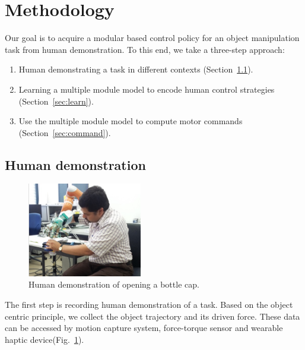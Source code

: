\documentclass[preprint,12pt]{elsarticle}
\begin{document}
\section{Methodology}
\label{sec:method}
Our goal is to acquire a modular based control policy for an object manipulation task from human demonstration. To this end, we take a three-step approach:
\begin{enumerate}
\item Human demonstrating a task in different contexts (Section~\ref{sec:demo}).
\item Learning a multiple module model to encode human control strategies (Section~\ref{sec:learn}).
\item Use the multiple module model to compute motor commands (Section~\ref{sec:command}).
\end{enumerate}


\subsection{Human demonstration}
\label{sec:demo}

\begin{figure}
  \centering
  \includegraphics[width=5cm]{./fig/ravin.jpg}
  \caption{ \scriptsize{Human demonstration of opening a bottle cap.}
}
\label{fig:demo}
\end{figure}

The first step is recording human demonstration of a task. Based on the object centric principle, we collect the object trajectory and its driven force. These data can be accessed by motion capture system, force-torque sensor and wearable haptic device(Fig.~\ref{fig:demo}).
\end{document}
